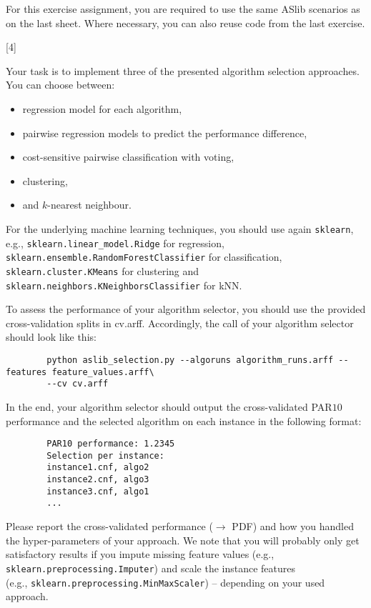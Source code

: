\documentclass{exam}
\begin{document}
	\gccs
	
	For this exercise assignment, 
	you are required to use the same ASlib scenarios as on the last sheet.
	Where necessary, you can also reuse code from the last exercise.
	\begin{questions}
		
		[4]
		
		Your task is to implement three of the presented algorithm selection approaches. You can choose between:
		
		\begin{itemize}
			\item regression model for each algorithm,
			\item pairwise regression models to predict the performance difference,
			\item cost-sensitive pairwise classification with voting,
			\item clustering,
			\item and $k$-nearest neighbour.
		\end{itemize} 
		
		For the underlying machine learning techniques, you should use again \texttt{sklearn},
		e.g., \texttt{sklearn.linear\_model.Ridge} for regression,
		\texttt{sklearn.ensemble.RandomForestClassifier} for classification,
		\texttt{sklearn.cluster.KMeans} for clustering
		and \texttt{sklearn.neighbors.KNeighborsClassifier} for kNN.
		
		To assess the performance of your algorithm selector,
		you should use the provided cross-validation splits in cv.arff.
		Accordingly, the call of your algorithm selector should look like this:
		
		\begin{verbatim}
		python aslib_selection.py --algoruns algorithm_runs.arff --features feature_values.arff\
		--cv cv.arff
		\end{verbatim}
		
		In the end, your algorithm selector should output the cross-validated PAR$10$ performance
		and the selected algorithm on each instance in the following format:
		
		\begin{verbatim}
		PAR10 performance: 1.2345
		Selection per instance:
		instance1.cnf, algo2
		instance2.cnf, algo3
		instance3.cnf, algo1
		...
		\end{verbatim}
		
		Please report the cross-validated performance ($\to$ PDF)
		and how you handled the hyper-parameters of your approach.
		We note that you will probably only get satisfactory results if you impute missing feature values (e.g., \texttt{sklearn.preprocessing.Imputer})
		and scale the instance features\\ (e.g., \texttt{sklearn.preprocessing.MinMaxScaler}) -- depending on your used approach.
		

\end{questions}
\end{document}
